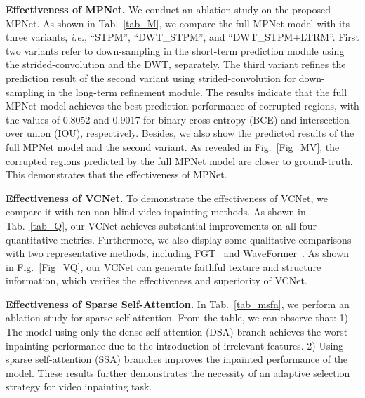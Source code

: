 \noindent\textbf{Effectiveness of MPNet.}
We conduct an ablation study on the proposed MPNet. 
As shown in Tab.~\ref{tab_M}, we compare the full MPNet model with its three variants,
\emph{i.e.}, “STPM”, “DWT\_STPM”, and “DWT\_STPM+LTRM”.
First two variants refer to down-sampling in the short-term prediction module using the strided-convolution and the DWT, separately.
The third variant refines the prediction result of the second variant using strided-convolution for down-sampling in the long-term refinement module.
The results indicate that the full MPNet model achieves the best prediction performance of corrupted regions, 
with the values of 0.8052 and 0.9017 for binary cross entropy (BCE) and intersection over union (IOU), respectively. 
Besides, we also show the predicted results of the full MPNet model and the second variant. 
As revealed in Fig.~\ref{Fig_MV}, the corrupted regions predicted by the full MPNet model are closer to ground-truth. This demonstrates that the effectiveness of MPNet.

\noindent\textbf{Effectiveness of VCNet.}
To demonstrate the effectiveness of VCNet, we compare it with ten non-blind video inpainting methods.
As shown in Tab.~\ref{tab_Q}, our VCNet achieves substantial improvements on all four quantitative metrics.
Furthermore, we also display some qualitative comparisons with two representative methods, including FGT~\cite{zhang2022flow} and WaveFormer~\cite{wu2024waveformer}. As shown in Fig.~\ref{Fig_VQ}, our VCNet can generate faithful texture and structure information, which verifies the effectiveness and superiority of VCNet.




\noindent\textbf{Effectiveness of Sparse Self-Attention.}
In Tab.~\ref{tab_msfn}, we perform an ablation study for sparse self-attention. From the table, we can observe that: 1) The model using only the dense self-attention (DSA) branch achieves the worst inpainting performance due to the introduction of irrelevant features. 2) Using sparse self-attention (SSA) branches improves the inpainted performance of the model. 
These results further demonstrates the necessity of an adaptive selection strategy for video inpainting task.


